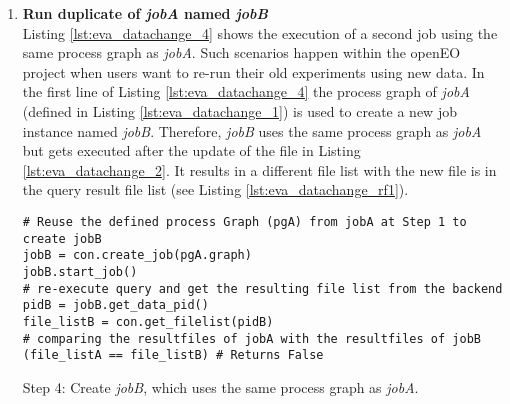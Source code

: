 \documentclass[draft,final]{vutinfth} %
\newenvironment{code}{\captionsetup{type=listing}}{}
\begin{document}
\begin{enumerate}
	\begin{code}
		\begin{verbatim}
# Get state of the resultfiles, so if they changed since 
# the original execution. 
file_listA = con.get_filelist(pidA)
file_listA["input_files"]["state"] # Returns "EQUAL"
		\end{verbatim}
		\caption{Re-execute \textit{pidA} query after one file got updated.}
		\label{lst:eva_datachange_3}
	\end{code}
	\newpage
	\begin{code}
		\begin{verbatim}
{'timestamp': '2017-05-08 00:00:00', 
'path': '/eodc/products/copernicus.eu/s2a_prd_msil1c/2017/05/04/
S2A_MSIL1C_20170504T101031_N0205_R022_T32TPR_20170504T101349.zip'}, 
{'timestamp': '2017-05-08 00:00:00',
'path':'/eodc/products/copernicus.eu/s2a_prd_msil1c/2017/05/04/
S2A_MSIL1C_20170504T101031_N0205_R022_T32TQS_20170504T101349.zip', 
{'timestamp': '2017-05-08 00:00:00', 
'path': '/eodc/products/copernicus.eu/s2a_prd_msil1c/2017/05/04/
S2A_MSIL1C_20170504T101031_N0205_R022_T32TQR_20170504T101349.zip'}, 
{'timestamp': '2017-05-08 00:00:00',
'path':'/eodc/products/copernicus.eu/s2a_prd_msil1c/2017/05/04/
S2A_MSIL1C_20170504T101031_N0205_R022_T32TPT_20170504T101349.zip'},
...
		\end{verbatim}
		\caption{First four resulting files of the file list.}
		\label{lst:eva_datachange_rf3}
	\end{code}

	\item \textbf{Run duplicate of \textit{jobA} named \textit{jobB}} \\
	Listing \ref{lst:eva_datachange_4} shows the execution of a second job using the same process graph as \textit{jobA}. Such scenarios happen within the openEO project when users want to re-run their old experiments using new data. In the first line of Listing \ref{lst:eva_datachange_4} the process graph of \textit{jobA} (defined in Listing \ref{lst:eva_datachange_1}) is used to create a new job instance named \textit{jobB}. Therefore, \textit{jobB} uses the same process graph as \textit{jobA} but gets executed after the update of the file in Listing \ref{lst:eva_datachange_2}. It results in a different file list with the new file is in the query result file list (see Listing \ref{lst:eva_datachange_rf1}).
	\begin{code}
		\begin{verbatim}
# Reuse the defined process Graph (pgA) from jobA at Step 1 to create jobB
jobB = con.create_job(pgA.graph)
jobB.start_job()
# re-execute query and get the resulting file list from the backend
pidB = jobB.get_data_pid()
file_listB = con.get_filelist(pidB)
# comparing the resultfiles of jobA with the resultfiles of jobB
(file_listA == file_listB) # Returns False
		\end{verbatim}
		\caption{Step 4: Create \textit{jobB}, which uses the same process graph as \textit{jobA}.}
		\label{lst:eva_datachange_4}
	\end{code}
	

\end{enumerate}
\end{document}
